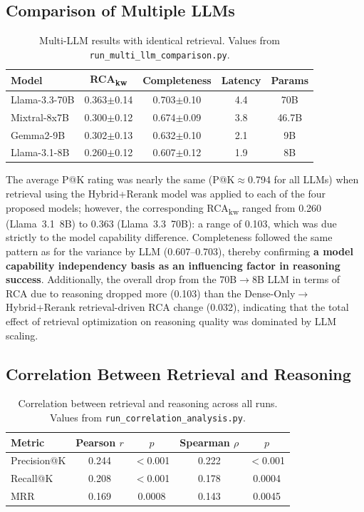 \documentclass[11pt,a4paper]{article}
\begin{document}
\subsection{Comparison of Multiple LLMs}
\label{sec:multi-llm}

\begin{table}[h]
\centering
\small
\caption{Multi-LLM results with identical retrieval.
Values from \texttt{run\_multi\_llm\_comparison.py}.}
\label{tab:multi-llm}
\begin{tabular}{lcccc}
\toprule
\textbf{Model} & \textbf{RCA\textsubscript{kw}} & \textbf{Completeness} & \textbf{Latency} & \textbf{Params} \\
\midrule
Llama-3.3-70B        & 0.363$\pm$0.14 & 0.703$\pm$0.10 & 4.4 & 70B \\
Mixtral-8x7B         & 0.300$\pm$0.12 & 0.674$\pm$0.09 & 3.8 & 46.7B \\
Gemma2-9B            & 0.302$\pm$0.13 & 0.632$\pm$0.10 & 2.1 & 9B \\
Llama-3.1-8B         & 0.260$\pm$0.12 & 0.607$\pm$0.12 & 1.9 & 8B \\
\bottomrule
\end{tabular}
\end{table}

The average P@K rating was nearly the same (P@K$\approx$0.794 for
all LLMs) when retrieval using the Hybrid+Rerank model was applied
to each of the four proposed models; however, the corresponding
RCA\textsubscript{kw} ranged from 0.260 (Llama~3.1~8B) to 0.363
(Llama~3.3~70B): a range of 0.103, which was due strictly to the
model capability difference.
Completeness followed the same pattern as for the variance by LLM
(0.607--0.703), thereby confirming \textbf{a model capability
independency basis as an influencing factor in reasoning success}.
Additionally, the overall drop from the 70B$\to$8B LLM in terms of
RCA due to reasoning dropped more (0.103) than the
Dense-Only$\to$Hybrid+Rerank retrieval-driven RCA change (0.032),
indicating that the total effect of retrieval optimization on
reasoning quality was dominated by LLM scaling.

\subsection{Correlation Between Retrieval and Reasoning}

\begin{table}[h]
\centering
\small
\caption{Correlation between retrieval and reasoning across all runs.
Values from \texttt{run\_correlation\_analysis.py}.}
\label{tab:correlation}
\begin{tabular}{lcccc}
\toprule
\textbf{Metric} & \textbf{Pearson $r$} & \textbf{$p$} & \textbf{Spearman $\rho$} & \textbf{$p$} \\
\midrule
Precision@K  & 0.244 & $<$0.001 & 0.222 & $<$0.001 \\
Recall@K     & 0.208 & $<$0.001 & 0.178 & 0.0004 \\
MRR          & 0.169 & 0.0008 & 0.143 & 0.0045 \\
\bottomrule
\end{tabular}
\end{table}
\end{document}
